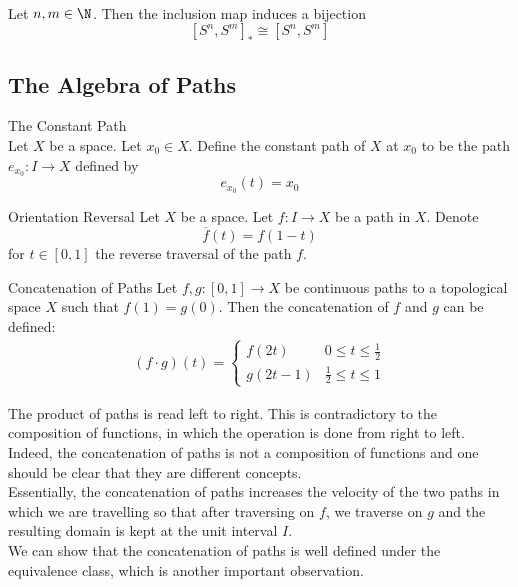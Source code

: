 \documentclass[a4paper]{article}
\begin{document}
\begin{prp}{}{}\\
Let $n,m\in\N$. Then the inclusion map induces a bijection $$[S^n,S^m]_\ast\cong[S^n,S^m]$$
\end{prp}

\subsection{The Algebra of Paths}
\begin{defn}{The Constant Path}{}\\
Let $X$ be a space. Let $x_0\in X$. Define the constant path of $X$ at $x_0$ to be the path $e_{x_0}:I\to X$ defined by $$e_{x_0}(t)=x_0$$
\end{defn}

\begin{defn}{Orientation Reversal}{} Let $X$ be a space. Let $f:I\to X$ be a path in $X$. Denote $$\overline{f}(t)=f(1-t)$$ for $t\in[0,1]$ the reverse traversal of the path $f$. 
\end{defn}

\begin{defn}{Concatenation of Paths}{} Let $f,g:[0,1]\to X$ be continuous paths to a topological space $X$ such that $f(1)=g(0)$. Then the concatenation of $f$ and $g$ can be defined:
\begin{align*}
(f\cdot g)(t)=\begin{cases}
f(2t) & 0\leq t\leq\frac{1}{2}\\
g(2t-1) & \frac{1}{2}\leq t\leq 1
\end{cases}
\end{align*}
\end{defn}

The product of paths is read left to right. This is contradictory to the composition of functions, in which the operation is done from right to left. Indeed, the concatenation of paths is not a composition of functions and one should be clear that they are different concepts. \\

Essentially, the concatenation of paths increases the velocity of the two paths in which we are travelling so that after traversing on $f$, we traverse on $g$ and the resulting domain is kept at the unit interval $I$. \\

We can show that the concatenation of paths is well defined under the equivalence class, which is another important observation. 
\end{document}
